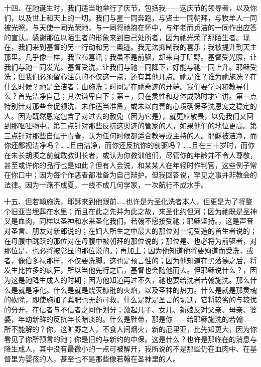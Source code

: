 十四、在祂诞生时，我们适当地举行了庆节，包括我——这庆节的领导者，以及你们，以及世上和天上的一切。我们与星一同奔跑，与贤士一同朝拜，与牧羊人一同被光照，与天使一同光荣祂，与一同将祂抱在怀中，与年老而贞洁的一同作出应答的宣认。感谢那位以陌生者的形象来到自己处所者，因为祂光荣了那陌生者。现在，我们来到基督的另一行动和另一奥迹。我无法抑制我的喜乐；我被提升到天主那里。几乎像一样，我宣布喜讯；我虽不是前驱，却来自于旷野。基督受光照，让我们与祂一同发光。基督受洗，让我们与祂一同降下，好能与祂一同上升。耶稣受洗；但我们必须留心注意的不仅这一点，还有其他几点。祂是谁？谁为祂施洗？在什么时候？祂是全洁者；由施洗；时间是在祂奇迹的开端。我们要学习和教导什么？首先洁净自己；其次谦卑自下；第三，只在灵性和身体成熟时才宣讲。第一点特别针对那些仓促领洗、未作适当准备，或未以向善的心境确保圣洗恩宠之稳定的人。因为既然恩宠包含了对过去的赦免（因为它是），就更应敬畏，以免我们又回到那呕吐物中。第二点针对那些反抗这奥迹的管家的人，如果他们的地位更高。第三点针对那些自信于青春，认为任何时候都适合教导或主持的人。耶稣被洁净，而你还鄙视洁净吗？……且由洁净，而你还反抗你的前驱吗？……且在三十岁时，而你在未长胡须之前就敢教训长者，或认为你教训他们，尽管你的年龄并不令人尊敬，甚至或许你的品行也是如此？但有人会说，和某某人在年轻时作判官，这些例子常在你口中；因为每个作恶者都准备为自己辩护。但我回答说，罕见之事并非教会的法律。因为一燕不成夏，一线不成几何学家，一次航行不成水手。\par

十五、但若翰施洗，耶稣来到他跟前……也许是为圣化洗者本人，但更是为了将整个旧亚当埋葬在水里；而且在此之先并为此之故，来圣化约但河；因为祂既是圣神又是血肉，同样以圣神和水来圣化我们。若翰不愿接受祂；耶稣坚持。，这是声音对圣言、朋友对新郎说的；在妇人所生之中最大的那位对一切受造的首生者说的；在母腹中跳跃的那位对在母腹中被朝拜的那位说的；那位是、也必将为前驱者，对那位是、也必将被彰显的那位说的。；再加上；因为他知道他将要殉道而受洗，或者，像伯多禄那样，不仅要洗脚。这也是预言性的；因为他知道在黑落德之后，将发生比拉多的疯狂，所以当他先行之后，基督也会随他而去。但耶稣说什么？，因为这是祂降生成人的时期；因为他知道再过不久，祂也要给洗者若翰施洗。那么什么是就是净化。什么是就是烧灭糠秕的火焰，以及圣神的热力。什么是就是那灵魂的砍除，即使施加了粪肥也无药可救。什么是就是圣言的切割，它将较劣的与较优的分开，在信者与不信者之间作划分；激起儿子、女儿、新娘反对父亲、母亲、婆婆，年幼新鲜的反抗年长暗淡的。什么是鞋带，那是你——给耶稣施洗的若翰——所不能解的？你，这旷野之人，不食人间烟火，新的厄里亚，比先知更大，因为你看见了你所预言的祂；你是旧约与新约的中保。这是什么？也许是那临在的消息与降生成人，其中没有最微小的一点可被解开，我所说的不是那些仍在血肉中、在基督里为婴孩的人，甚至也不是那些像若翰在圣神里的人。\par

